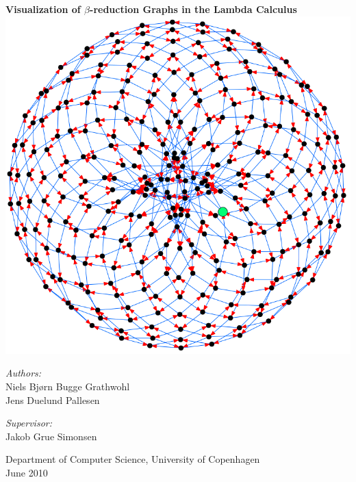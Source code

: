 
\begin{titlepage}


\begin{center}
	\textcolor{sectionColor}{{\huge \bfseries Visualization of $\beta$-reduction Graphs in the Lambda Calculus}\\[2.0cm]}
	\includegraphics[scale=0.6]{../images/Regular15_NEATO.png}\\[1.0cm]
\end{center}

\begin{center}

\begin{minipage}{0.4\textwidth}
\begin{flushleft} \large
\emph{Authors:}\\
Niels Bj\o rn Bugge Grathwohl\\
Jens Duelund Pallesen
\end{flushleft}
\end{minipage}
\begin{minipage}{0.4\textwidth}
\begin{flushright} \large
\emph{Supervisor:} \\
Jakob Grue Simonsen
\end{flushright}
\end{minipage}
 
\vfill
 
{Department of Computer Science, University of Copenhagen\\
June 2010}
 
\end{center}
 
\end{titlepage}